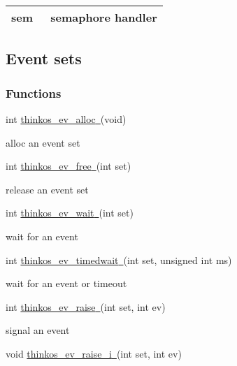 {\protect\hypertarget{t.42f0ad63e27678006eae2b4c683934157041a4d7}{}{}\protect\hypertarget{t.25}{}{}

\begin{longtable}[]{@{}ll@{}}
\toprule
\begin{minipage}[t]{0.47\columnwidth}\raggedright\strut
{sem}{~}\strut
\end{minipage} & \begin{minipage}[t]{0.47\columnwidth}\raggedright\strut
{semaphore handler }\strut
\end{minipage}\tabularnewline
\bottomrule
\end{longtable}

\paragraph{\texorpdfstring{{}}{}}\label{section-4}

\subsection{\texorpdfstring{{Event sets}}{Event sets}}\label{event-sets}

\subsubsection{\texorpdfstring{{Functions}}{Functions}}\label{h.41mghml}

{int
}{\protect\hyperlink{h.2grqrue}{thinkos\_ev\_alloc}}{\protect\hyperlink{h.2grqrue}{~}}{(void)}

{alloc an event set }

{int
}{\protect\hyperlink{h.vx1227}{thinkos\_ev\_free}}{\protect\hyperlink{h.vx1227}{~}}{(int
set)}

{release an event set }

{int
}{\protect\hyperlink{h.3fwokq0}{thinkos\_ev\_wait}}{\protect\hyperlink{h.3fwokq0}{~}}{(int
set)}

{wait for an event }

{int
}{\protect\hyperlink{h.1v1yuxt}{thinkos\_ev\_timedwait}}{\protect\hyperlink{h.1v1yuxt}{~}}{(int
set, unsigned int ms)}

{wait for an event or timeout }

{int
}{\protect\hyperlink{h.4f1mdlm}{thinkos\_ev\_raise}}{\protect\hyperlink{h.4f1mdlm}{~}}{(int
set, int ev)}

{signal an event }

{void
}{\protect\hyperlink{h.2u6wntf}{thinkos\_ev\_raise\_i}}{\protect\hyperlink{h.2u6wntf}{~}}{(int
set, int ev)}

}
